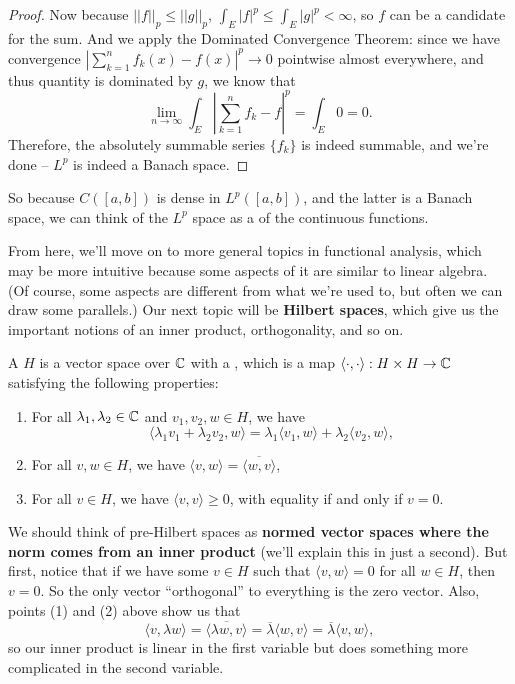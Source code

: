 \begin{proof}
Now because $||f||_p \le ||g||_p$, $\int_E |f|^p \le \int_E |g|^p < \infty$, so $f$ can be a candidate for the sum. And we apply the Dominated Convergence Theorem: since we have convergence $\left|\sum_{k=1}^n f_k(x) - f(x)\right|^p \to 0$ pointwise almost everywhere, and thus quantity is dominated by $g$, we know that 
\[
    \lim_{n \to \infty} \int_E \left|\sum_{k=1}^n f_k - f\right|^p = \int_E 0 = 0.
\]
Therefore, the absolutely summable series $\{f_k\}$ is indeed summable, and we're done -- $L^p$ is indeed a Banach space. 
\end{proof}

So because $C([a, b])$ is dense in $L^p([a, b])$, and the latter is a Banach space, we can think of the $L^p$ space as a  of the continuous functions.

From here, we'll move on to more general topics in functional analysis, which may be more intuitive because some aspects of it are similar to linear algebra. (Of course, some aspects are different from what we're used to, but often we can draw some parallels.) Our next topic will be \textbf{Hilbert spaces}, which give us the important notions of an inner product, orthogonality, and so on.

\begin{definition}
A  $H$ is a vector space over $\mathbb C$ with a , which is a map $\langle \cdot, \cdot \rangle: H \times H \to \mathbb C$ satisfying the following properties:
\begin{enumerate}
\item For all $\lambda_1, \lambda_2 \in \mathbb C$ and $v_1, v_2, w \in H$, we have 
\[
    \langle \lambda_1 v_1 + \lambda_2 v_2, w \rangle = \lambda_1 \langle v_1, w \rangle + \lambda_2 \langle v_2, w \rangle,
\]
\item For all $v, w \in H$, we have $\langle v, w\rangle = \overline{\langle w, v \rangle}$,
\item For all $v \in H$, we have $\langle v, v \rangle \ge 0$, with equality if and only if $v = 0$.
\end{enumerate}
\end{definition}

We should think of pre-Hilbert spaces as \textbf{normed vector spaces where the norm comes from an inner product} (we'll explain this in just a second). But first, notice that if we have some $v \in H$ such that $\langle v, w \rangle = 0$ for all $w \in H$, then $v = 0$. So the only vector ``orthogonal'' to everything is the zero vector. Also, points (1) and (2) above show us that 
\[
    \langle v, \lambda w \rangle = \overline{\langle \lambda w, v \rangle} = \overline{\lambda} \langle w, v \rangle = \overline{\lambda} \langle v, w\rangle,
\]
so our inner product is linear in the first variable but does something more complicated in the second variable. 

